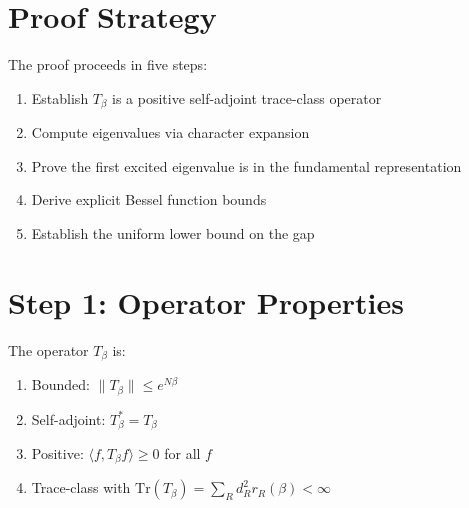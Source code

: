 \section{Proof Strategy}

The proof proceeds in five steps:
\begin{enumerate}
\item Establish $T_\beta$ is a positive self-adjoint trace-class operator
\item Compute eigenvalues via character expansion
\item Prove the first excited eigenvalue is in the fundamental representation
\item Derive explicit Bessel function bounds
\item Establish the uniform lower bound on the gap
\end{enumerate}

\section{Step 1: Operator Properties}

\begin{lemma}
\label{lem:positive-sa}
The operator $T_\beta$ is:
\begin{enumerate}
\item Bounded: $\|T_\beta\| \leq e^{N\beta}$
\item Self-adjoint: $T_\beta^* = T_\beta$
\item Positive: $\langle f, T_\beta f \rangle \geq 0$ for all $f$
\item Trace-class with $\mathrm{Tr}(T_\beta) = \sum_R d_R^2 r_R(\beta) < \infty$
\end{enumerate}
\end{lemma}

